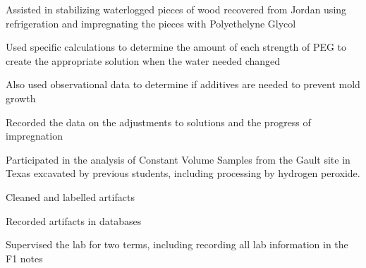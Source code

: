 \documentclass[letterpaper]{resume}
\begin{document}
\begin{compactitem}
\item Assisted in stabilizing waterlogged pieces of wood recovered from Jordan using refrigeration and impregnating the pieces with Polyethelyne Glycol
\item Used specific calculations to determine the amount of each strength of PEG to create the appropriate solution when the water needed changed
\item Also used observational data to determine if additives are needed to prevent mold growth
\item Recorded the data on the adjustments to solutions and the progress of impregnation
\end{compactitem}

\begin{compactitem}
\item Participated in the analysis of Constant Volume Samples from the Gault site in Texas excavated by previous students, including processing by hydrogen peroxide.
\item Cleaned and labelled artifacts
\item Recorded artifacts in databases
\item Supervised the lab for two terms, including recording all lab information in the F1 notes
\end{compactitem}
%
\end{document}
